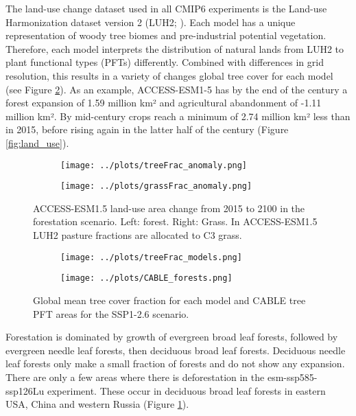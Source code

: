 \documentclass[]{article}
\begin{document}
The land-use change dataset used in all CMIP6 experiments is the Land-use Harmonization dataset version 2 (LUH2; \cite{hurtt_harmonization_2020}).
Each model has a unique representation of woody tree biomes and pre-industrial potential vegetation.
Therefore, each model interprets the distribution of natural lands from LUH2 to plant functional types (PFTs) differently.
Combined with differences in grid resolution, this results in a variety of changes global tree cover for each model (see Figure \ref{fig:CABLE_PFTs}).
As an example, ACCESS-ESM1-5 has by the end of the century a forest expansion of 1.59 million km² and agricultural abandonment of -1.11 million km².
By mid-century crops reach a minimum of 2.74 million km² less than in 2015, before rising again in the latter half of the century (Figure \ref{fig:land_use}).

\begin{figure}[H]
    \centering
    \begin{subfigure}[b]{0.45\linewidth}
        \texttt{[image: ../plots/treeFrac\_anomaly.png]}
    \end{subfigure}
    \begin{subfigure}[b]{0.45\linewidth}
        \texttt{[image: ../plots/grassFrac\_anomaly.png]}
    \end{subfigure}
    \caption{ACCESS-ESM1.5 land-use area change from 2015 to 2100 in the forestation scenario. Left: forest. Right: Grass. In ACCESS-ESM1.5 LUH2 pasture fractions are allocated to C3 grass.}
    \label{fig:land_use_map}
\end{figure}

\begin{figure}[H]
    \centering
    \begin{subfigure}[b]{0.45\linewidth}
        \texttt{[image: ../plots/treeFrac\_models.png]}
    \end{subfigure}
    \begin{subfigure}[b]{0.45\linewidth}
        \texttt{[image: ../plots/CABLE\_forests.png]}
    \end{subfigure}
    \caption{Global mean tree cover fraction for each model and CABLE tree PFT areas for the SSP1-2.6 scenario.}
    \label{fig:CABLE_PFTs}
\end{figure}

Forestation is dominated by growth of evergreen broad leaf forests, followed by evergreen needle leaf forests, then deciduous broad leaf forests.
Deciduous needle leaf forests only make a small fraction of forests and do not show any expansion.
There are only a few areas where there is deforestation in the esm-ssp585-ssp126Lu experiment.
These occur in deciduous broad leaf forests in eastern USA, China and western Russia (Figure \ref{fig:land_use_map}).
\end{document}
